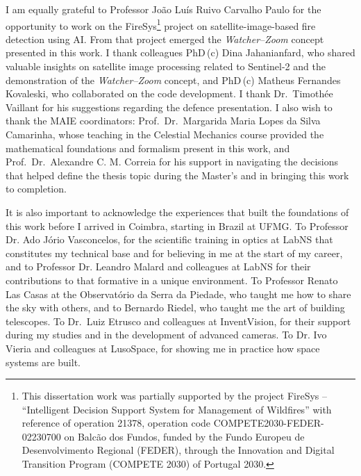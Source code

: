 I am equally grateful to Professor João Luís Ruivo Carvalho Paulo for the opportunity to work on the FireSys\footnote{This dissertation work was partially supported by the project FireSys -- ``Intelligent Decision Support System for Management of Wildfires'' with reference of operation 21378, operation code COMPETE2030-FEDER-02230700 on Balcão dos Fundos, funded by the Fundo Europeu de Desenvolvimento Regional (FEDER), through the Innovation and Digital Transition Program (COMPETE 2030) of Portugal 2030.} project on satellite-image-based fire detection using AI. From that project emerged the \emph{Watcher--Zoom} concept presented in this work.
I thank colleagues PhD\,(c) Dina Jahanianfard, who shared valuable insights on satellite image processing related to Sentinel-2 and the demonstration of the \emph{Watcher--Zoom} concept, and PhD\,(c) Matheus Fernandes Kovaleski, who collaborated on the code development.
I thank Dr.\ Timothée Vaillant for his suggestions regarding the defence presentation.
I also wish to thank the MAIE coordinators: Prof.\ Dr.\ Margarida Maria Lopes da Silva Camarinha, whose teaching in the Celestial Mechanics course provided the mathematical foundations and formalism present in this work, and Prof.\ Dr.\ Alexandre C. M. Correia for his support in navigating the decisions that helped define the thesis topic during the Master's and in bringing this work to completion.

It is also important to acknowledge the experiences that built the foundations of this work before I arrived in Coimbra, starting in Brazil at UFMG. To Professor Dr. Ado Jório Vasconcelos, for the scientific training in optics at LabNS that constitutes my technical base and for believing in me at the start of my career, and to Professor Dr. Leandro Malard and colleagues at LabNS for their contributions to that formative in a unique environment. To Professor Renato Las Casas at the Observatório da Serra da Piedade, who taught me how to share the sky with others, and to Bernardo Riedel, who taught me the art of building telescopes. To Dr.\ Luiz Etrusco and colleagues at InventVision, for their support during my studies and in the development of advanced cameras. To Dr. Ivo Vieria and colleagues at LusoSpace, for showing me in practice how space systems are built.

